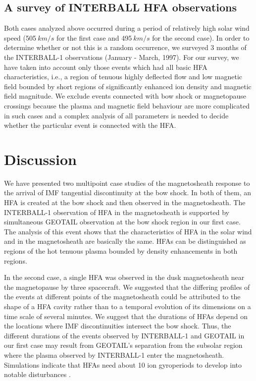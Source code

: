 \documentclass{article}
\begin{document}
\begin{article}
\subsection{A survey of INTERBALL HFA observations}
Both cases analyzed above occurred during a period of relatively
high solar wind speed (505$\>km/s$ for the first case and
495$\>km/s$ for the
second case). In order to determine whether or not this is a random
occurrence, we surveyed  3 months of the INTERBALL-1
observations (January - March, 1997).
For our survey, we have taken into account only those events
which had all basic HFA characteristics, i.e., a region of tenuous
highly deflected flow and low magnetic field bounded by short
regions of significantly enhanced ion density and magnetic field
magnitude. We exclude events connected with bow shock or
magnetopause crossings because the plasma and magnetic field
behaviour are more complicated in such cases and a complex
analysis of all parameters is needed to decide whether the particular
event is connected with the HFA.

\section{Discussion}
We have presented two multipoint case studies of the
magnetosheath response to the arrival of  IMF tangential
discontinuity at the bow shock.
In both of them, an HFA is created at the bow shock and then
observed in the magnetosheath. The INTERBALL-1 observation of HFA
in the magnetosheath is supported by simultaneous GEOTAIL
observation at the bow shock region in our first case. The analysis
of this event shows that the characteristics of HFA in the
solar wind and in the magnetosheath are basically the same. HFAs
can be distinguished as regions of the hot tenuous plasma bounded
by density enhancements in both regions.

In the second case, a single HFA was observed in the dusk magnetosheath
near the magnetopause by three spacecraft.
We suggested that the differing profiles of the
events at different points of the magnetosheath could be attributed
to the shape of a HFA cavity rather than to a temporal evolution of
its dimensions on a time scale of several minutes.
We suggest that the durations of HFAs depend on the locations
where IMF discontinuities intersect the bow shock.
Thus, the different durations of the events observed by
INTERBALL-1 and GEOTAIL  in our first case  may result from
GEOTAIL's separation from the subsolar region where the plasma
observed by INTERBALL-1 enter the magnetosheath.
Simulations indicate that HFAs need about 10
ion gyroperiods to develop into notable disturbances \citep{th}.


\end{article}
\end{document}
